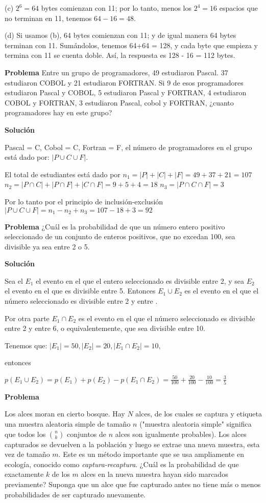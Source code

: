(c) $2^6 = 64$ bytes comienzan con 11; por lo tanto, menos los $2^4 = 16$
espacios que no terminan en 11, tenemos $64 - 16 = 48$.

(d) Si usamos (b), 64 bytes comienzan con 11; y de igual manera 64 bytes
terminan con 11. Sumándolos, tenemos 64+64 = 128, y cada byte que empieza y
termina con 11 se cuenta doble. Así, la respuesta es 128 - 16 = 112 bytes. 

\textbf{Problema}
Entre un grupo de programadores, 49 estudiaron Pascal. 37 estudiaron COBOL y 21
estudiaron FORTRAN. Si 9 de esos programadores estudiaron Pascal y COBOL, 5
estudiaron Pascal y FORTRAN, 4 estudiaron COBOL y FORTRAN, 3 estudiaron Pascal,
cobol y FORTRAN, ¿cuanto programadores hay en este grupo?

\textbf{Solución}

Pascal = C, Cobol = C, Fortran = F, el número de programadores en el grupo está
dado por: $|P \cup C \cup F|$.

El total de estudiantes está dado por $n_1 = |P|+|C|+|F| = 49+37+21=107$ $n_2
=|P \cap C| + |P \cap F| + |C \cap F| = 9+5+4 = 18$ $n_3 = |P \cap C \cap F| =
3$

Por lo tanto por el principio de inclusión-exclusión $|P \cup C \cup F| = n_1 - n_2 +
n_3 = 107-18+3 = 92$

\textbf{Problema}
¿Cuál es la probabilidad de que un número entero positivo seleccionado de un
conjunto de enteros positivos, que no excedan 100, sea divisible ya sea entre 2
o 5. 

\textbf{Solución}

Sea el $E_1$ el evento en el que el entero seleccionado es divisible entre 2, y
sea $E_2$ el evento en el que es divisible entre 5. Entonces $E_1 \cup E_2$ es
el evento en el que el número seleccionado es divisible entre 2 y entre .

Por otra parte $E_1 \cap E_2$ es el evento en el que el número seleccionado es
divisible entre 2 y entre 6, o equivalentemente, que sea divisible entre 10.

Tenemos que:
$|E_1|=50, |E_2|=20,|E_1 \cap E_2|=10,$

entonces

$p(E_1 \cup E_2)=p(E_1)+p(E_2)-p(E_1 \cap E_2) = \frac{50}{100} + \frac{20}{100} - \frac{10}{100} = \frac{3}{5}$


\textbf{Problema}

Los alces moran en cierto bosque. Hay $N$ alces, de los cuales se captura y
etiqueta una muestra aleatoria simple de tamaño $n$ ("muestra aleatoria simple"
significa que todos los $\binom{n}{k}$ conjuntos de $n$ alces son igualmente
probables). Los alces capturados se devuelven a la población y luego se extrae
una nueva muestra, esta vez de tamaño $m$. Este es un método importante que se
usa ampliamente en ecología, conocido como \textit{captura-recaptura}. ¿Cuál es
la probabilidad de que exactamente $k$ de los $m$ alces en la nueva muestra
hayan sido marcados previamente? Suponga que un alce que fue capturado antes no
tiene más o menos probabilidades de ser capturado nuevamente.

